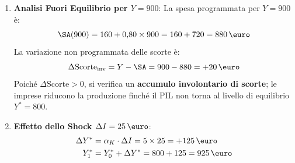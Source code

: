 \begin{esercizio}
\begin{enumerate}
    \item \textbf{Analisi Fuori Equilibrio per $Y = 900$}:
    La spesa programmata per $Y = 900$ è:
    \begin{equation*}
        \SA(900) = 160 + 0{,}80 \times 900 = 160 + 720 = 880\,\text{\euro}
    \end{equation*}
    La variazione non programmata delle scorte è:
    \begin{equation*}
        \Delta \mathrm{Scorte}_{\text{inv}} = Y - \SA = 900 - 880 = +20\,\text{\euro}
    \end{equation*}
    Poiché $\Delta \mathrm{Scorte} > 0$, si verifica un \textbf{accumulo involontario di scorte}; le imprese riducono la produzione finché il PIL non torna al livello di equilibrio $Y^* = 800$.
    
    \item \textbf{Effetto dello Shock $\Delta I = 25\,\text{\euro}$}:
    \begin{align*}
        \Delta Y^* &= \alpha_K \cdot \Delta I = 5 \times 25 = +125\,\text{\euro} \\
        Y_1^* &= Y_0^* + \Delta Y^* = 800 + 125 = 925\,\text{\euro}
    \end{align*}
\end{enumerate}
\end{esercizio}
